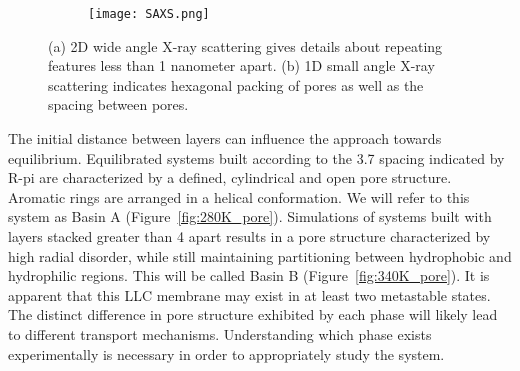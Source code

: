 \begin{figure}[ht]
	\centering
	\begin{subfigure}[t]{0.47\linewidth}
		\centering
		\caption{}\label{fig:WAXS}
	\end{subfigure}
	\begin{subfigure}[t]{0.43\linewidth}
		\centering
		\texttt{[image: SAXS.png]}
		\caption{}\label{fig:SAXS}
	\end{subfigure}
	\caption{(a) 2D wide angle X-ray scattering gives details about repeating features less than 1 nanometer apart. (b) 1D small angle X-ray scattering indicates hexagonal packing of pores as well as the spacing between pores.}\label{fig:SWAXS}
\end{figure}

The initial distance between layers can influence the approach towards
equilibrium. Equilibrated systems built according to the 3.7 \angstrom 
spacing indicated by R-pi are characterized by a defined, cylindrical and
open pore structure. Aromatic rings are arranged in a helical conformation.
We will refer to this system as Basin A (Figure~\ref{fig:280K_pore}). Simulations
of systems built with layers stacked greater than 4 \angstrom apart results in a pore
structure characterized by high radial disorder, while still maintaining 
partitioning between hydrophobic and hydrophilic regions. This will be 
called Basin B (Figure~\ref{fig:340K_pore}). It is apparent that this LLC membrane
may exist in at least two metastable states. The distinct difference in 
pore structure exhibited by each phase will likely lead to different transport
mechanisms. Understanding which phase exists experimentally is necessary in 
order to appropriately study the system.

